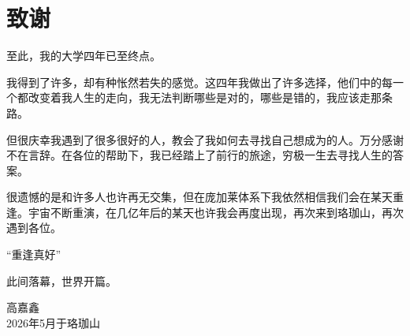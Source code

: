 
\clearpage
{}
{}

\chapter*{致谢}
至此，我的大学四年已至终点。

我得到了许多，却有种怅然若失的感觉。这四年我做出了许多选择，他们中的每一个都改变着我人生的走向，我无法判断哪些是对的，哪些是错的，我应该走那条路。

但很庆幸我遇到了很多很好的人，教会了我如何去寻找自己想成为的人。万分感谢不在言辞。在各位的帮助下，我已经踏上了前行的旅途，穷极一生去寻找人生的答案。

很遗憾的是和许多人也许再无交集，但在庞加莱体系下我依然相信我们会在某天重逢。宇宙不断重演，在几亿年后的某天也许我会再度出现，再次来到珞珈山，再次遇到各位。

“重逢真好”

此间落幕，世界开篇。



\vspace{2em}
\begin{flushright}
高嘉鑫\\
2026年5月于珞珈山
\end{flushright}
